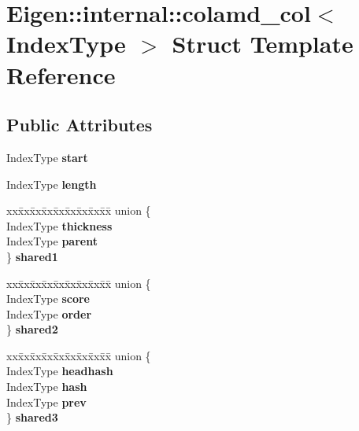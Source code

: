\hypertarget{struct_eigen_1_1internal_1_1colamd__col}{}\section{Eigen\+::internal\+::colamd\+\_\+col$<$ Index\+Type $>$ Struct Template Reference}
\label{struct_eigen_1_1internal_1_1colamd__col}
\subsection*{Public Attributes}
\begin{DoxyCompactItemize}
\item 
\mbox{\label{struct_eigen_1_1internal_1_1colamd__col_a687db8c17f3026acfb354d52def9326c}} 
Index\+Type {\bfseries start}
\item 
\mbox{\label{struct_eigen_1_1internal_1_1colamd__col_a7654b4d10c3ea9cae1522b31bd138eb1}} 
Index\+Type {\bfseries length}
\item 
\mbox{\label{struct_eigen_1_1internal_1_1colamd__col_a8f2a6f77b7137771ca1ad46427f02445}} 
\begin{tabbing}
xx\=xx\=xx\=xx\=xx\=xx\=xx\=xx\=xx\=\kill
union \{\\
\>IndexType {\bfseries thickness}\\
\>IndexType {\bfseries parent}\\
\} {\bfseries shared1}\\

\end{tabbing}\item 
\mbox{\label{struct_eigen_1_1internal_1_1colamd__col_ac5a42f827095bc92ac774190c449a55d}} 
\begin{tabbing}
xx\=xx\=xx\=xx\=xx\=xx\=xx\=xx\=xx\=\kill
union \{\\
\>IndexType {\bfseries score}\\
\>IndexType {\bfseries order}\\
\} {\bfseries shared2}\\

\end{tabbing}\item 
\mbox{\label{struct_eigen_1_1internal_1_1colamd__col_a5daeb89557b9c6aa469d286e118c4139}} 
\begin{tabbing}
xx\=xx\=xx\=xx\=xx\=xx\=xx\=xx\=xx\=\kill
union \{\\
\>IndexType {\bfseries headhash}\\
\>IndexType {\bfseries hash}\\
\>IndexType {\bfseries prev}\\
\} {\bfseries shared3}\\


\end{tabbing}
\end{DoxyCompactItemize}
